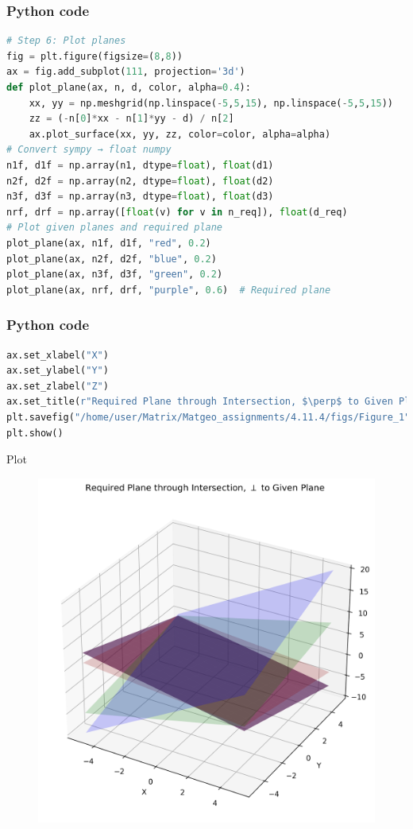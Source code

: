 \documentclass{beamer}
\begin{document}
\begin{frame}[fragile]
    \frametitle{Python code}

    \begin{lstlisting}[language=Python]
# Step 6: Plot planes
fig = plt.figure(figsize=(8,8))
ax = fig.add_subplot(111, projection='3d')
def plot_plane(ax, n, d, color, alpha=0.4):
    xx, yy = np.meshgrid(np.linspace(-5,5,15), np.linspace(-5,5,15))
    zz = (-n[0]*xx - n[1]*yy - d) / n[2]
    ax.plot_surface(xx, yy, zz, color=color, alpha=alpha)
# Convert sympy → float numpy
n1f, d1f = np.array(n1, dtype=float), float(d1)
n2f, d2f = np.array(n2, dtype=float), float(d2)
n3f, d3f = np.array(n3, dtype=float), float(d3)
nrf, drf = np.array([float(v) for v in n_req]), float(d_req)
# Plot given planes and required plane
plot_plane(ax, n1f, d1f, "red", 0.2)     
plot_plane(ax, n2f, d2f, "blue", 0.2)    
plot_plane(ax, n3f, d3f, "green", 0.2)   
plot_plane(ax, nrf, drf, "purple", 0.6)  # Required plane
    \end{lstlisting}
    
\end{frame}

\begin{frame}[fragile]
    \frametitle{Python code}

    \begin{lstlisting}[language=Python]
ax.set_xlabel("X")
ax.set_ylabel("Y")
ax.set_zlabel("Z")
ax.set_title(r"Required Plane through Intersection, $\perp$ to Given Plane")
plt.savefig("/home/user/Matrix/Matgeo_assignments/4.11.4/figs/Figure_1")
plt.show()

    \end{lstlisting}
    
\end{frame}

\begin{frame}{Plot}
    \begin{figure}[H]
    \centering
    \includegraphics[width=0.6\columnwidth]{figs/Figure_1.png}
    \label{fig:1}
\end{figure}
\end{frame}
\end{document}
